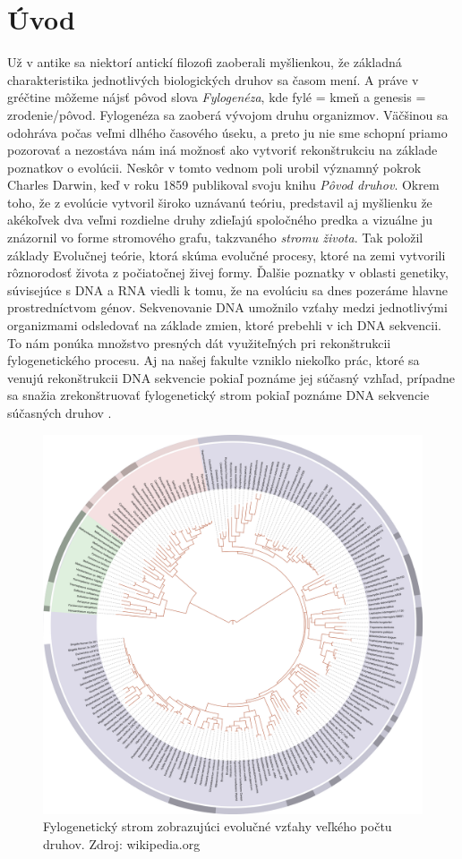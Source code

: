 \chapter*{Úvod}
Už v antike sa niektorí antickí filozofi zaoberali myšlienkou, že základná charakteristika jednotlivých biologických druhov sa časom mení.
A práve v gréčtine môžeme nájsť pôvod slova \emph{Fylogenéza}, kde fylé = kmeň a genesis = zrodenie/pôvod.
Fylogenéza sa zaoberá vývojom druhu organizmov. Väčšinou sa odohráva počas veľmi dlhého časového úseku, 
a preto ju nie sme schopní priamo pozorovať a nezostáva nám iná možnosť ako vytvoriť rekonštrukciu na základe poznatkov o evolúcii.
Neskôr v tomto vednom poli urobil významný pokrok Charles Darwin, keď v roku 1859 publikoval svoju knihu \emph{Pôvod druhov}.
Okrem toho, že z evolúcie vytvoril široko uznávanú teóriu, predstavil aj myšlienku že akékoľvek dva veľmi rozdielne
druhy zdieľajú spoločného predka a vizuálne ju znázornil vo forme stromového grafu, takzvaného \emph{stromu života}.
Tak položil základy Evolučnej teórie, ktorá skúma evolučné procesy, ktoré
na zemi vytvorili rôznorodosť života z počiatočnej živej formy. 
Ďalšie poznatky v oblasti genetiky, súvisejúce s DNA a RNA viedli k tomu, že na evolúciu sa
dnes pozeráme hlavne prostredníctvom génov.
Sekvenovanie DNA umožnilo vzťahy medzi jednotlivými organizmami odsledovať na základe zmien, ktoré prebehli v ich DNA sekvencii.
To nám ponúka množstvo presných dát využiteľných pri rekonštrukcii fylogenetického procesu.
Aj na našej fakulte vzniklo niekoľko prác, ktoré sa venujú rekonštrukcii DNA sekvencie pokiaľ poznáme jej súčasný vzhľad,
prípadne sa snažia zrekonštruovať fylogenetický strom pokiaľ poznáme DNA sekvencie súčasných druhov 
\cite{Kovac2011,Hozza2014,Herencsar2014,Vinar2010}. 
\begin{figure}[t]
 \centering
\includegraphics[width=1\textwidth]{images/tol}
\caption{Fylogenetický strom zobrazujúci evolučné vzťahy veľkého počtu druhov. Zdroj: wikipedia.org}\label{obr:tol}
\end{figure}

